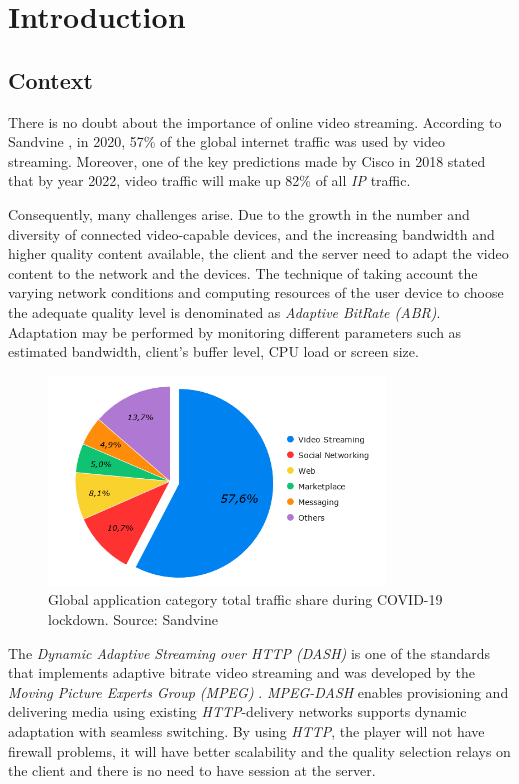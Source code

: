 \chapter{Introduction}
\label{chap:introduction}

\section{Context}
\label{sec:context}

There is no doubt about the importance of online video streaming.
According to Sandvine \cite{sandvine1},
in 2020, 57\% of the global internet traffic was used by video streaming.
Moreover, one of the key predictions made by Cisco in 2018 \cite{cisco1}
stated that by year 2022, video traffic will make up 82\% 
of all \textit{IP} traffic.

Consequently, many challenges arise. Due to the growth in the 
number and diversity of connected video-capable devices, and the 
increasing bandwidth and higher quality content available, the 
client and the server need to adapt the video content to
the network and the devices. The technique of taking account the 
varying network conditions and computing resources of the user 
device to choose the adequate quality level is denominated as
\textit{Adaptive BitRate (ABR)}. Adaptation may be performed by
monitoring different parameters such as estimated bandwidth,
client's buffer level, CPU load or screen size.


\begin{figure}[h]
  \label{fig:chart1}
    \centering
    \includegraphics[width=0.8\textwidth]{img/chart2.png}
    \caption{Global application category total traffic share during COVID-19 lockdown. Source: Sandvine \cite{sandvine1}}
  \end{figure}

The \textit{Dynamic Adaptive Streaming over HTTP (DASH)} is one of the
standards that implements adaptive bitrate video streaming and was developed
by the \textit{Moving Picture Experts Group (MPEG)} \cite{dash1}. \textit{MPEG-DASH} 
enables provisioning and delivering media using existing \textit{HTTP}-delivery 
networks supports dynamic adaptation with seamless switching. By using
\textit{HTTP}, the player will not have firewall problems, it will have better
scalability and the quality selection relays on the client and there is no
need to have session at the server.

